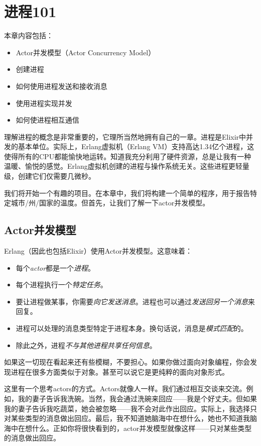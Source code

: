 \chapter{进程101}\label{chapt:processes}

本章内容包括：

\begin{itemize}

\item  Actor并发模型（Actor Concurrency Model）
\item  创建进程
\item  如何使用进程发送和接收消息
\item  使用进程实现并发
\item  如何使进程相互通信
\end{itemize}

理解进程的概念是非常重要的，它理所当然地拥有自己的一章。进程是Elixir中并发的基本单位。实际上，Erlang虚拟机（Erlang VM）支持高达1.34亿个进程，这使得所有的CPU都能愉快地运转。知道我充分利用了硬件资源，总是让我有一种温暖、愉悦的感觉。Erlang虚拟机创建的进程与操作系统无关。这些进程更轻量级，创建它们仅需要几微秒。

我们将开始一个有趣的项目。在本章中，我们将构建一个简单的程序，用于报告特定城市/州/国家的温度。但首先，让我们了解一下actor并发模型。

\section{Actor并发模型}

Erlang（因此也包括Elixir）使用Actor并发模型。这意味着：

\begin{itemize}
	\item 每个\emph{actor}都是一个\emph{进程}。 
  \item 每个进程执行一个\emph{特定任务}。 
  \item 要让进程做某事，你需要\emph{向它发送消息}。进程也可以通过\emph{发送回另一个消息}来回复。
  \item 进程可以处理的消息类型特定于进程本身。换句话说，消息是\emph{模式匹配}的。
  \item 除此之外，进程\emph{不与其他进程共享任何信息}。
\end{itemize}

如果这一切现在看起来还有些模糊，不要担心。如果你做过面向对象编程，你会发现进程在很多方面类似于对象。甚至可以说它是更纯粹的面向对象形式。

这里有一个思考actors的方式。Actors就像人一样。我们通过相互交谈来交流。例如，我的妻子告诉我洗碗。当然，我会通过洗碗来回应——我是个好丈夫。但如果我的妻子告诉我吃蔬菜，她会被忽略——我不会对此作出回应。实际上，我选择只对某些类型的消息做出回应。最后，我不知道她脑海中在想什么，她也不知道我脑海中在想什么。正如你将很快看到的，actor并发模型就像这样——只对某些类型的消息做出回应。

